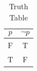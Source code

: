 \begin{table}[ht]
\caption{Truth Table}
\centering
\begin{tabular}{|c||c|}
\hline
$ p $ & $  \neg p $ \\
\hline
F & T \\
T & F \\
\hline
\end{tabular}
\label{table:tt1}
\end{table}
